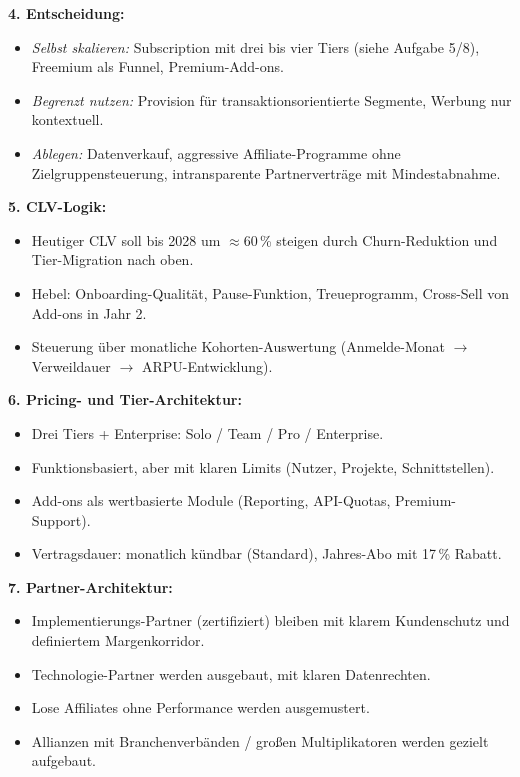 \documentclass[11pt,a4paper,oneside]{article}
\begin{document}
\begin{loesungbox}
\smallskip
\textbf{4. Entscheidung:}
\begin{itemize}
  \item \emph{Selbst skalieren:} Subscription mit drei bis vier Tiers (siehe Aufgabe 5/8), Freemium als Funnel, Premium-Add-ons.
  \item \emph{Begrenzt nutzen:} Provision für transaktionsorientierte Segmente, Werbung nur kontextuell.
  \item \emph{Ablegen:} Datenverkauf, aggressive Affiliate-Programme ohne Zielgruppensteuerung, intransparente Partnerverträge mit Mindestabnahme.
\end{itemize}

\smallskip
\textbf{5. CLV-Logik:}
\begin{itemize}
  \item Heutiger CLV soll bis 2028 um $\approx 60$\,\% steigen \textendash{} durch Churn-Reduktion und Tier-Migration nach oben.
  \item Hebel: Onboarding-Qualität, Pause-Funktion, Treueprogramm, Cross-Sell von Add-ons in Jahr 2.
  \item Steuerung über monatliche Kohorten-Auswertung (Anmelde-Monat $\rightarrow$ Verweildauer $\rightarrow$ ARPU-Entwicklung).
\end{itemize}

\smallskip
\textbf{6. Pricing- und Tier-Architektur:}
\begin{itemize}
  \item Drei Tiers + Enterprise: Solo / Team / Pro / Enterprise.
  \item Funktionsbasiert, aber mit klaren Limits (Nutzer, Projekte, Schnittstellen).
  \item Add-ons als wertbasierte Module (Reporting, API-Quotas, Premium-Support).
  \item Vertragsdauer: monatlich kündbar (Standard), Jahres-Abo mit 17\,\% Rabatt.
\end{itemize}

\smallskip
\textbf{7. Partner-Architektur:}
\begin{itemize}
  \item Implementierungs-Partner (zertifiziert) bleiben \textendash{} mit klarem Kundenschutz und definiertem Margenkorridor.
  \item Technologie-Partner werden ausgebaut, mit klaren Datenrechten.
  \item Lose Affiliates ohne Performance werden ausgemustert.
  \item Allianzen mit Branchenverbänden / großen Multiplikatoren werden gezielt aufgebaut.
\end{itemize}


\end{loesungbox}
\end{document}
